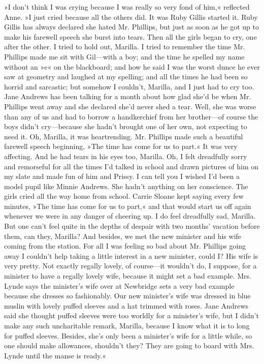 »I don't think I was crying because I was really so very fond of him,« reflected Anne. »I just cried because all the others did. It was Ruby Gillis started it. Ruby Gillis has always declared she hated Mr. Phillips, but just as soon as he got up to make his farewell speech she burst into tears. Then all the girls began to cry, one after the other. I tried to hold out, Marilla. I tried to remember the time Mr. Phillips made me sit with Gil—with a boy; and the time he spelled my name without an »e« on the blackboard; and how he said I was the worst dunce he ever saw at geometry and laughed at my spelling; and all the times he had been so horrid and sarcastic; but somehow I couldn't, Marilla, and I just had to cry too. Jane Andrews has been talking for a month about how glad she'd be when Mr. Phillips went away and she declared she'd never shed a tear. Well, she was worse than any of us and had to borrow a handkerchief from her brother—of course the boys didn't cry—because she hadn't brought one of her own, not expecting to need it. Oh, Marilla, it was heartrending. Mr. Phillips made such a beautiful farewell speech beginning, »The time has come for us to part.« It was very affecting. And he had tears in his eyes too, Marilla. Oh, I felt dreadfully sorry and remorseful for all the times I'd talked in school and drawn pictures of him on my slate and made fun of him and Prissy. I can tell you I wished I'd been a model pupil like Minnie Andrews. She hadn't anything on her conscience. The girls cried all the way home from school. Carrie Sloane kept saying every few minutes, »The time has come for us to part,« and that would start us off again whenever we were in any danger of cheering up. I do feel dreadfully sad, Marilla. But one can't feel quite in the depths of despair with two months' vacation before them, can they, Marilla? And besides, we met the new minister and his wife coming from the station. For all I was feeling so bad about Mr. Phillips going away I couldn't help taking a little interest in a new minister, could I? His wife is very pretty. Not exactly regally lovely, of course—it wouldn't do, I suppose, for a minister to have a regally lovely wife, because it might set a bad example. Mrs. Lynde says the minister's wife over at Newbridge sets a very bad example because she dresses so fashionably. Our new minister's wife was dressed in blue muslin with lovely puffed sleeves and a hat trimmed with roses. Jane Andrews said she thought puffed sleeves were too worldly for a minister's wife, but I didn't make any such uncharitable remark, Marilla, because I know what it is to long for puffed sleeves. Besides, she's only been a minister's wife for a little while, so one should make allowances, shouldn't they? They are going to board with Mrs. Lynde until the manse is ready.«


